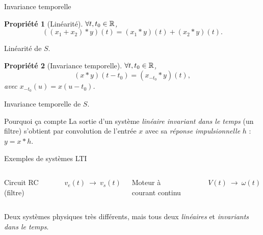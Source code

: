 \documentclass[aspectratio=43,10pt]{beamer}
\newtheorem{proposition}{Propriété}
\newcommand{\highlight}[1]{{\color{niceblue}\emph{#1}}}
\newcommand{\slidefig}[2]{%
\begin{center}
\resizebox{#1}{!}{}
\end{center}
}
\begin{document}
\begin{frame}{Invariance temporelle}
    \begin{overprint}
        \begin{proposition}[Linéarité]
            $\forall t,t_0\in{\mathbb{R}}$, $$((x_1 + x_2)*y)(t) = (x_{1} * y)(t) + (x_{2} * y)(t).$$
        \end{proposition}
        \slidefig{0.85\textwidth}{lti-linearity.tex}
        \begin{center}\small Linéarité de $S$.\end{center}
        \begin{proposition}[Invariance temporelle]
            $\forall t,t_0\in{\mathbb{R}}$, $$(x*y)(t-t_0) = (x_{-t_{0}} * y)(t),$$ avec $x_{-t_{0}}(u) = x(u-t_0)$.
        \end{proposition}
    \slidefig{0.7\textwidth}{lti-time-invariance.tex}
    \begin{center}\small Invariance temporelle de $S$.\end{center}
    \end{overprint}
    \begin{alertblock}{Pourquoi ça compte}
        La sortie d'un système \highlight{linéaire invariant dans le
        temps} (un filtre) s'obtient par convolution de l'entrée $x$
        avec sa \highlight{réponse impulsionnelle} $h$ : $y=x*h$.
    \end{alertblock}
\end{frame}

\begin{frame}{Exemples de systèmes LTI}
    \begin{columns}
        \centering \small Circuit RC (filtre)
        \slidefig{\textwidth}{example-rc.tex}
        \begin{center}\small $v_e(t) \ \longrightarrow\ v_s(t)$\end{center}
        \centering \small Moteur à courant continu
        \slidefig{\textwidth}{example-motor.tex}
        \begin{center}\small $V(t) \ \longrightarrow\ \omega(t)$\end{center}
    \end{columns}
    \begin{center}
        \small Deux systèmes physiques très différents, mais tous deux
        \highlight{linéaires} et \highlight{invariants dans le temps}.
    \end{center}
\end{frame}
\end{document}
